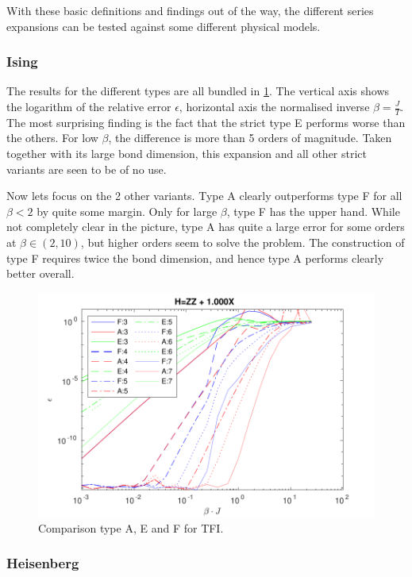 With these basic definitions and findings out of the way, the different series expansions can be tested against some different physical models.

\subsubsection{Ising}

The results for the different types are all bundled in \cref{fig:benchmark:tising}. The vertical axis shows the logarithm of the relative error $\epsilon$, horizontal axis the normalised inverse $\beta= \frac{J}{T}$. The most surprising finding is the fact that the strict type E performs worse than the others. For low $\beta$, the difference is more than 5 orders of magnitude. Taken together with its large bond dimension, this expansion  and all other strict variants are seen to be of no use.

Now lets focus on the 2 other variants. Type A clearly outperforms type F for all $\beta<2$ by quite some margin. Only for large $\beta$, type F has the upper hand. While not completely clear in the picture, type A has quite a large error for some orders at $\beta \in (2,10) $, but higher orders seem to solve the problem. The construction of type F requires twice the bond dimension, and hence type A performs clearly better overall.

\begin{figure}[!htbp]
    \center
    \includegraphics[width=\textwidth]{Figuren/benchmarking/t_ising.pdf}
    \caption{Comparison type A, E and F for \Gls{TFI}. }
    \label{fig:benchmark:tising}
\end{figure}

\subsubsection{Heisenberg}


